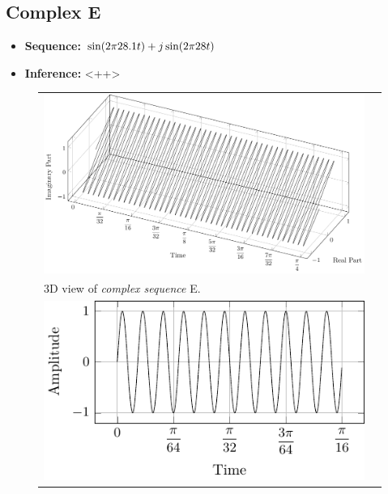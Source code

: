 \documentclass[../../course]{subfiles}
\begin{document}
\subsection{Complex E}

\begin{itemize} [label=]

    \item \textbf{Sequence:} $\sin(2 \pi 28.1 t) + j \sin(2 \pi 28 t)$

    \item \textbf{Inference:} <++>

\end{itemize}

\begin{figure} [H]

    \renewcommand{\arraystretch}{0.75}
    \centering
    \begin{NiceTabularX} {\textwidth} {
            *{2}{>{\centering\arraybackslash}X}
        }

         {
             {
                \includegraphics[height = \textheight] {tikzpics/plotComplexE.pdf}
            }
        }

        &
        \\

         {
            \vbox{
                 {3D view of \emph{complex sequence} E.}
                \label{plt:cmplxE}
            }
        }

        &
        \\

         {
             {
                \includegraphics[height = \textheight] {tikzpics/plotShortX2.pdf}
            }
        }


\end{NiceTabularX}
\end{figure}
\end{document}
